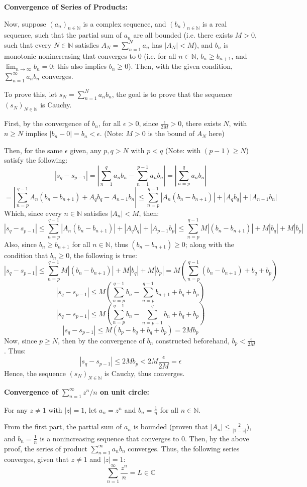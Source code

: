 \documentclass{article}
\begin{document}
\hfill

\textbf{Convergence of Series of Products:}

Now, suppose $(a_n)_{n\in\mathbb{N}}$ is a complex sequence, and $(b_n)_{n\in\mathbb{N}}$ is a real sequence, such that the partial sum of $a_n$ are all bounded
(i.e. there exists $M>0$, such that every $N\in\mathbb{N}$ satisfies $A_N=\sum_{n=1}^{N}a_n$ has $|A_N|<M$), and $b_n$ is monotonic 
nonincreasing that converges to $0$ (i.e. for all $n\in\mathbb{N}$, $b_n\geq b_{n+1}$, and $\lim_{n\rightarrow\infty}b_n=0$; this also implies $b_n\geq 0$). Then, with the given condition, $\sum_{n=1}^{\infty}a_nb_n$ converges.

\hfill

To prove this, let $s_N = \sum_{n=1}^{N}a_nb_n$, the goal is to prove that the sequence $(s_N)_{N\in\mathbb{N}}$ is Cauchy.

First, by the convergence of $b_n$, for all $\epsilon>0$, since $\frac{\epsilon}{2M}>0$, there exists $N$, with $n\geq N$ implies $|b_n-0|=b_n<\epsilon$. (Note: $M>0$ is the bound of $A_N$ here)

Then, for the same $\epsilon$ given, any $p,q> N$ with $p<q$ (Note: with $(p-1)\geq N$) satisfy the following:
$$|s_q-s_{p-1}| = \left|\sum_{n=1}^{q}a_nb_n-\sum_{n=1}^{p-1}a_nb_n\right| = \left|\sum_{n=p}^{q}a_nb_n\right|$$
$$=\left|\sum_{n=p}^{q-1}A_n(b_n-b_{n+1})+A_qb_q-A_{n-1}b_{n}\right| \leq \sum_{n=p}^{q-1}|A_n(b_n-b_{n+1})|+|A_qb_q|+|A_{n-1}b_n|$$
Which, since every $n\in\mathbb{N}$ satisfies $|A_n|<M$, then:
$$|s_q-s_{p-1}| \leq \sum_{n=p}^{q-1}|A_n(b_n-b_{n+1})|+|A_qb_q|+|A_{p-1}b_p| \leq \sum_{n=p}^{q-1}M|(b_n-b_{n+1})|+M|b_q|+M|b_p|$$
Also, since $b_n\geq b_{n+1}$ for all $n\in\mathbb{N}$, thus $(b_n-b_{n+1})\geq 0$; along with the condition that $b_n\geq 0$, the following is true:
$$|s_q-s_{p-1}|\leq \sum_{n=p}^{q-1}M|(b_n-b_{n+1})|+M|b_q|+M|b_p| = M\left(\sum_{n=p}^{q-1}(b_n-b_{n+1})+b_q+b_p\right)$$ 
$$|s_q-s_{p-1}|\leq M\left(\sum_{n=p}^{q-1}b_n - \sum_{n=p}^{q-1}b_{n+1}+b_q+b_p\right)$$
$$|s_q-s_{p-1}|\leq M\left(\sum_{n=p}^{q-1}b_n - \sum_{n=p+1}^{q}b_{n}+b_q+b_p\right)$$
$$|s_q-s_{p-1}|\leq M(b_p-b_q+b_q+b_p) = 2Mb_p$$
Now, since $p\geq N$, then by the convergence of $b_n$ constructed beforehand, $b_p<\frac{\epsilon}{2M}$. Thus:
$$|s_q-s_{p-1}|\leq 2Mb_p < 2M\frac{\epsilon}{2M} = \epsilon$$
Hence, the sequence $(s_N)_{N\in\mathbb{N}}$ is Cauchy, thus converges.

\hfill

\textbf{Convergence of $\sum_{n=1}^{\infty}z^n/n$ on unit circle:}

For any $z\neq 1$ with $|z|=1$, let $a_n=z^n$ and $b_n=\frac{1}{n}$ for all $n\in\mathbb{N}$.

From the first part, the partial sum of $a_n$ is bounded (proven that $|A_n|\leq \frac{2}{|1-z|}$), and $b_n=\frac{1}{n}$ is a nonincreasing sequence
that converges to $0$. Then, by the above proof, the series of product $\sum_{n=1}^{\infty}a_nb_n$ converges. Thus, the following series converges, given that $z\neq 1$ and $|z|=1$:
$$\sum_{n=1}^{\infty}\frac{z^n}{n}=L\in\mathbb{C}$$
\end{document}
